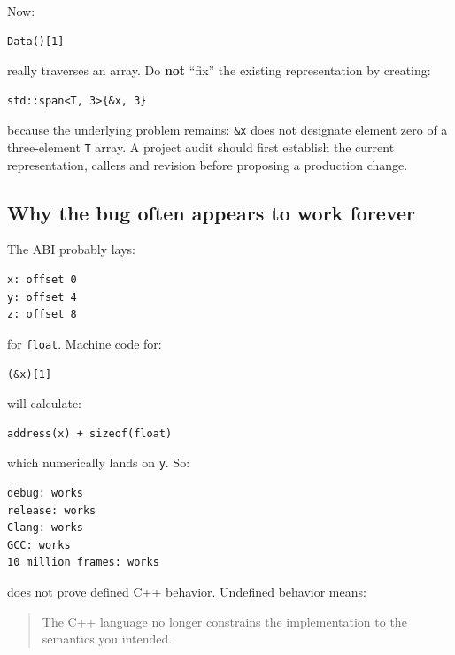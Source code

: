 Now:

\begin{verbatim}
Data()[1]
\end{verbatim}

really traverses an array. Do \textbf{not} ``fix'' the existing representation by creating:

\begin{verbatim}
std::span<T, 3>{&x, 3}
\end{verbatim}

because the underlying problem remains: \texttt{\&x} does not designate element zero of a three-element \texttt{T} array. A project audit should first establish the current representation, callers and revision before proposing a production change.

\subsection{Why the bug often appears to work forever}\label{01-foundations-i-ch003-why-the-bug-often-appears-to-work-forever}

\hypertarget{01-foundations-i-ch003-why-the-bug-often-appears-to-work-forever}{}

The ABI probably lays:

\begin{verbatim}
x: offset 0
y: offset 4
z: offset 8
\end{verbatim}

for \texttt{float}. Machine code for:

\begin{verbatim}
(&x)[1]
\end{verbatim}

will calculate:

\begin{verbatim}
address(x) + sizeof(float)
\end{verbatim}

which numerically lands on \texttt{y}. So:

\begin{verbatim}
debug: works
release: works
Clang: works
GCC: works
10 million frames: works
\end{verbatim}

does not prove defined C++ behavior. Undefined behavior means:

\begin{quote}
The C++ language no longer constrains the implementation to the semantics you intended.
\end{quote}

